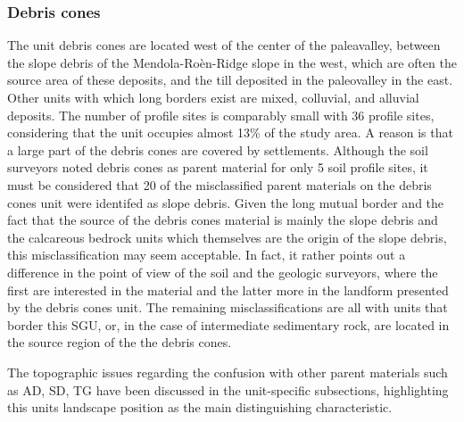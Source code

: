 \documentclass[preprint,12pt,authoryear]{elsarticle}
\begin{document}
\subsubsection{Debris cones}
The unit debris cones are located west of the center of the paleavalley, between the slope debris of the Mendola-Ro\`en-Ridge slope in the west, which are often the source area of these deposits, and the till deposited in the paleovalley in the east. Other units with which long borders exist are mixed, colluvial, and alluvial deposits. The number of profile sites is comparably small with 36 profile sites, considering that the unit occupies almost 13\% of the study area. A reason is that a large part of the debris cones are covered by settlements.  Although the soil surveyors noted debris cones as parent material for only 5 soil profile sites, it must be considered that 20 of the misclassified parent materials on the debris cones unit were identifed as slope debris. Given the long mutual border and the fact that the source of the debris cones material is mainly the slope debris and the calcareous bedrock units which themselves are the origin of the slope debris, this misclassification may seem acceptable. In fact, it rather points out a difference in the point of view of the soil and the geologic surveyors, where the first are interested in the material and the latter more in the landform presented by the debris cones unit. The remaining misclassifications are all with units that border this SGU, or, in the case of intermediate sedimentary rock, are located in the source region of the the debris cones.

The topographic issues regarding the confusion with other parent materials such as AD, SD, TG have been discussed in the unit-specific subsections, highlighting this units landscape position as the main distinguishing characteristic.
\end{document}
